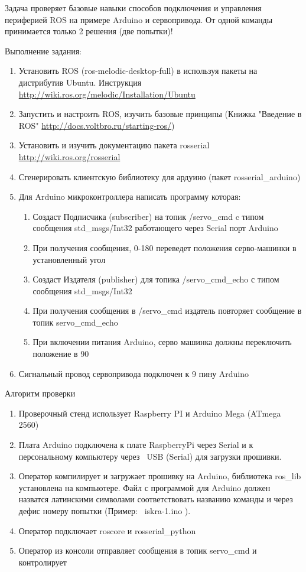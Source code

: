 
Задача проверяет базовые навыки способов подключения и управления периферией ROS на примере Arduino и сервопривода. От одной команды принимается только 2 решения (две попытки)!

Выполнение задания:

\begin{enumerate}
    \item Установить ROS (ros-melodic-desktop-full) в используя пакеты на дистрибутив Ubuntu. Инструкция \url{http://wiki.ros.org/melodic/Installation/Ubuntu}
    \item Запустить и настроить ROS, изучить базовые принципы (Книжка "Введение в ROS" \url{http://docs.voltbro.ru/starting-ros/})
    \item Установить и изучить документацию пакета rosserial \url{http://wiki.ros.org/rosserial}
    \item Сгенерировать клиентскую библиотеку для ардуино (пакет rosserial\_arduino)
    \item Для Arduino микроконтроллера написать программу которая:
    \begin{enumerate}
        \item Создаст Подписчика (subscriber) на топик /servo\_cmd c типом сообщения std\_msgs/Int32 работающего через Serial порт Arduino
        \item При получения сообщения, 0-180 переведет положения серво-машинки в установленный угол
        \item Создаст Издателя (publisher) для топика /servo\_cmd\_echo с типом сообщения std\_msgs/Int32
        \item При получения сообщения в /servo\_cmd издатель повторяет сообщение в топик servo\_cmd\_echo 
        \item При включении питания Arduino, серво машинка должны переключить положение в 90
    \end{enumerate}
    \item Сигнальный провод сервопривода подключен к 9 пину Arduino
\end{enumerate}

Алгоритм проверки

\begin{enumerate}
    \item Проверочный стенд использует Raspberry PI и Arduino Mega (ATmega 2560)
    \item Плата Arduino подключена к плате RaspberryPi через Serial и к персональному компьютеру через  USB (Serial) для загрузки прошивки.
    \item Оператор компилирует и загружает прошивку на Arduino, библиотека ros\_lib установлена на компьютере. Файл с программой для Arduino должен назватся латинскими символами соответствовать названию команды и через дефис номеру попытки (Пример:  iskra-1.ino ).
    \item Оператор подключает roscore и rosserial\_python
    \item Оператор из консоли отправляет сообщения в топик servo\_cmd и контролирует
\end{enumerate}

